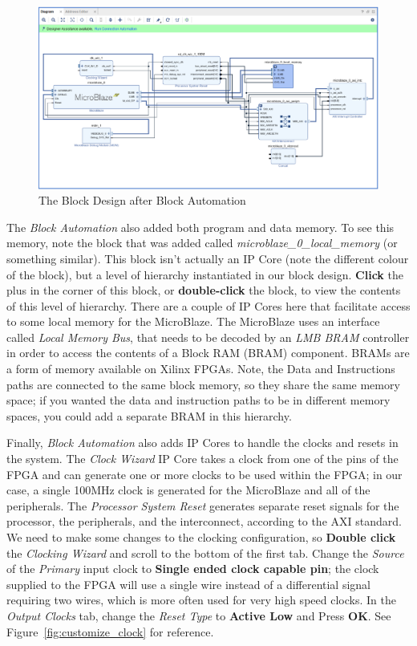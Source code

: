 \documentclass[11pt]{article}
\begin{document}
\begin{figure}[h]
    \centering
    \includegraphics[width=\textwidth]{images/block_design_mb.png}
    \caption{The Block Design after Block Automation}
    \label{fig:block_design_mb}
\end{figure}

The \textit{Block Automation} also added both program and data memory. To see this memory, note the block that was added called \textit{microblaze\_0\_local\_memory} (or something similar). This block isn't actually an IP Core (note the different colour of the block), but a level of hierarchy instantiated in our block design. \textbf{Click} the plus in the corner of this block, or \textbf{double-click} the block, to view the contents of this level of hierarchy. There are a couple of IP Cores here that facilitate access to some local memory for the MicroBlaze. The MicroBlaze uses an interface called \textit{Local Memory Bus}, that needs to be decoded by an \textit{LMB BRAM} controller in order to access the contents of a Block RAM (BRAM) component. BRAMs are a form of memory available on Xilinx FPGAs. Note, the Data and Instructions paths are connected to the same block memory, so they share the same memory space; if you wanted the data and instruction paths to be in different memory spaces, you could add a separate BRAM in this hierarchy.

Finally, \textit{Block Automation} also adds IP Cores to handle the clocks and resets in the system. The \textit{Clock Wizard} IP Core takes a clock from one of the pins of the FPGA and can generate one or more clocks to be used within the FPGA; in our case, a single 100MHz clock is generated for the MicroBlaze and all of the peripherals. The \textit{Processor System Reset} generates separate reset signals for the processor, the peripherals, and the interconnect, according to the AXI standard. We need to make some changes to the clocking configuration, so \textbf{Double click} the \textit{Clocking Wizard} and scroll to the bottom of the first tab. Change the \textit{Source} of the \textit{Primary} input clock to \textbf{Single ended clock capable pin}; the clock supplied to the FPGA will use a single wire instead of a differential signal requiring two wires, which is more often used for very high speed clocks. In the \textit{Output Clocks} tab, change the \textit{Reset Type} to \textbf{Active Low} and Press \textbf{OK}. See Figure~\ref{fig:customize_clock} for reference.
\end{document}
